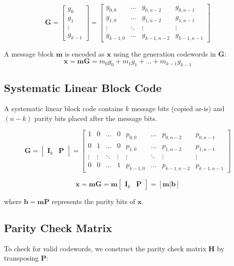 \documentclass[10pt]{article}
\begin{document}
\[
\mathbf{G} = \begin{bmatrix} g_0 \\ g_1 \\ \vdots \\ g_{k-1} \end{bmatrix} = \begin{bmatrix} g_{0,0} & \dots & g_{0,n-2} & g_{0,n-1} \\ g_{1,0} & \dots & g_{1,n-2} & g_{1,n-1} \\ \vdots & \ddots & \vdots & \vdots \\ g_{k-1,0} & \dots & g_{k-1,n-2} & g_{k-1,n-1} \end{bmatrix}
\]

A message block $\mathbf{m}$ is encoded as $\mathbf{x}$ using the generation codewords in $\mathbf{G}$:
\[
\mathbf{x} = \mathbf{m} \mathbf{G} = m_0 g_0 + m_1 g_1 + \dots + m_{k-1} g_{k-1}
\]

\subsection{Systematic Linear Block Code}
A systematic linear block code contains $k$ message bits (copied as-is) and $(n - k)$ parity bits placed after the message bits.

\[
\mathbf{G} = \begin{bmatrix} \mathbf{I}_k & \mathbf{P} \end{bmatrix} = \begin{bmatrix} 1 & 0 & \dots & 0 & p_{0,0} & \dots & p_{0,n-2} & p_{0,n-1} \\ 0 & 1 & \dots & 0 & p_{1,0} & \dots & p_{1,n-2} & p_{1,n-1} \\ \vdots & \vdots & \ddots & \vdots & \vdots & \ddots & \vdots & \vdots \\ 0 & 0 & \dots & 1 & p_{k-1,0} & \dots & p_{k-1,n-2} & p_{k-1,n-1} \end{bmatrix}
\]

\[
\mathbf{x} = \mathbf{m} \mathbf{G} = \mathbf{m} \begin{bmatrix} \mathbf{I}_k & \mathbf{P} \end{bmatrix} = [\mathbf{m} | \mathbf{b}]
\]

where $\mathbf{b} = \mathbf{m} \mathbf{P}$ represents the parity bits of $\mathbf{x}$.

\subsection{Parity Check Matrix}
To check for valid codewords, we construct the parity check matrix $\mathbf{H}$ by transposing $\mathbf{P}$:
\end{document}

